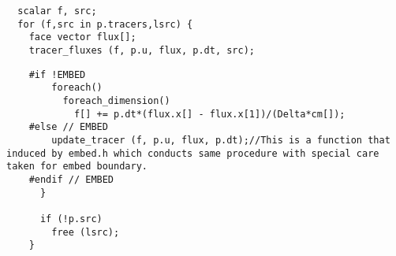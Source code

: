 \documentclass[a4paper]{article}
\newcommand{\para}[1]{\textbf{\emph{\textcolor{para}{#1}}}}
\begin{document}
\begin{multicols}{2}
  \columnbreak
  \begin{verbatim}
  scalar f, src;
  for (f,src in p.tracers,lsrc) {
    face vector flux[];
    tracer_fluxes (f, p.u, flux, p.dt, src);
  \end{verbatim}
\end{multicols}

\begin{center}
\end{center}

\newpage

\begin{multicols}{2}
  \columnbreak
  \begin{verbatim}
    #if !EMBED
        foreach()
          foreach_dimension()
            f[] += p.dt*(flux.x[] - flux.x[1])/(Delta*cm[]);
    #else // EMBED
        update_tracer (f, p.u, flux, p.dt);//This is a function that induced by embed.h which conducts same procedure with special care taken for embed boundary.
    #endif // EMBED
      }

      if (!p.src)
        free (lsrc);
    }
  \end{verbatim}
\end{multicols}

\appendix
\end{document}
